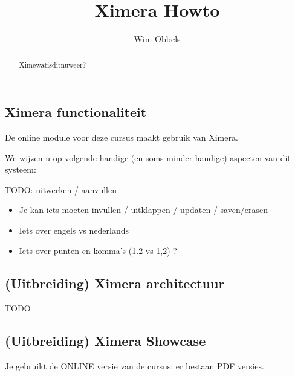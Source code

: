 \documentclass[handout]{ximera}
\author{Wim Obbels}
\title{Ximera Howto}
\begin{document}
\begin{abstract}
	Ximewatisditnuweer?
\end{abstract}
\maketitle

\subsection{Ximera functionaliteit}
De online module voor deze cursus maakt gebruik van Ximera.

We wijzen u op volgende handige (en soms minder handige) aspecten van dit systeem:


TODO: uitwerken / aanvullen


\begin{itemize}
	\item Je kan iets moeten invullen / uitklappen / updaten / saven/erasen

	\item Iets over engels vs nederlands

	\item Iets over punten en komma's  (1.2 vs 1,2) ?

\end{itemize}

\subsection{(Uitbreiding) Ximera architectuur}

TODO

\subsection{(Uitbreiding) Ximera Showcase}


\begin{onlineOnly}
    Je gebruikt de ONLINE versie van de cursus; er bestaan PDF versies.
\end{onlineOnly}
\end{document}

